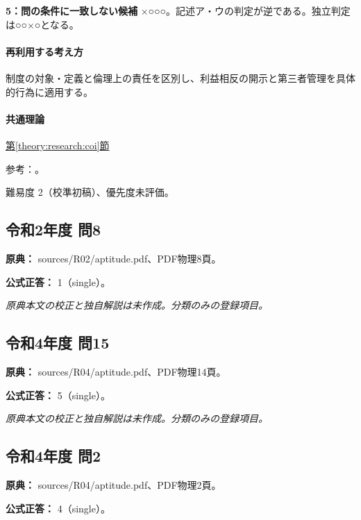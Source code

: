 \noindent\textbf{5：問の条件に一致しない候補} ×○○○。記述ア・ウの判定が逆である。独立判定は○○×○となる。\par

\paragraph{再利用する考え方} 制度の対象・定義と倫理上の責任を区別し、利益相反の開示と第三者管理を具体的行為に適用する。

\paragraph{共通理論} \hyperref[theory:research:coi]{第\ref*{theory:research:coi}節}

\par 参考：\cite{jsps_integrity2025}。

\par 難易度 2（校準初稿）、優先度未評価。

\subsection{令和2年度 問8}
\label{q:r02-reg-apt-08}

\noindent\textbf{原典：} sources/R02/aptitude.pdf、PDF物理8頁。

\textbf{公式正答：} 1（single）。

\par\textit{原典本文の校正と独自解説は未作成。分類のみの登録項目。}

\subsection{令和4年度 問15}
\label{q:r04-reg-apt-15}

\noindent\textbf{原典：} sources/R04/aptitude.pdf、PDF物理14頁。

\textbf{公式正答：} 5（single）。

\par\textit{原典本文の校正と独自解説は未作成。分類のみの登録項目。}

\subsection{令和4年度 問2}
\label{q:r04-reg-apt-02}

\noindent\textbf{原典：} sources/R04/aptitude.pdf、PDF物理2頁。

\textbf{公式正答：} 4（single）。

